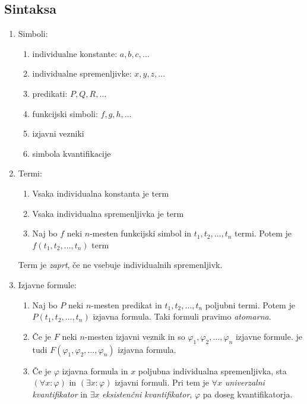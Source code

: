 \documentclass[12pt, a4paper]{article}
\begin{document}
\newpage

\subsection{Sintaksa}

\begin{enumerate}[label=\Alph*)]
\item Simboli:

\begin{enumerate}
\item individualne konstante: $a,b,c,\dots$
\item individualne spremenljivke: $x,y,z,\dots$
\item predikati: $P,Q,R,\dots$
\item funkcijski simboli: $f,g,h,\dots$
\item izjavni vezniki
\item simbola kvantifikacije
\end{enumerate}

\item Termi:

\begin{enumerate}
\item Vsaka individualna konstanta je term
\item Vsaka individualna spremenljivka je term
\item Naj bo $f$ neki $n$-mesten funkcijski simbol in $t_1,t_2,\dots,t_n$ termi. Potem je $f(t_1,t_2,\dots,t_n)$ term
\end{enumerate}

Term je \emph{zaprt}, če ne vsebuje individualnih spremenljivk.

\item Izjavne formule:

\begin{enumerate}
\item Naj bo $P$ neki $n$-mesten predikat in $t_1,t_2,\dots,t_n$ poljubni termi. Potem je $P(t_1,t_2,\dots,t_n)$ izjavna formula. Taki formuli pravimo \emph{atomarna}.
\item Če je $F$ neki $n$-mesten izjavni veznik in so $\varphi_1,\varphi_2,\dots,\varphi_n$ izjavne formule. je tudi $F(\varphi_1,\varphi_2,\dots,\varphi_n)$ izjavna formula.
\item Če je $\varphi$ izjavna formula in $x$ poljubna individualna spremenljivka, sta $(\forall x\colon\varphi)$ in $(\exists x\colon\varphi)$ izjavni formuli. Pri tem je $\forall x$ \emph{univerzalni kvantifikator} in $\exists x$ \emph{eksistenčni kvantifikator}, $\varphi$ pa doseg kvantifikatorja.
\end{enumerate}
\end{enumerate}
\end{document}
